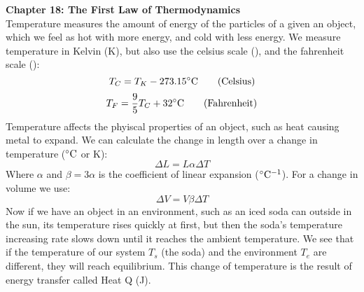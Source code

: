 \documentclass[11pt]{article}
\newcommand{\fahrenheit}{\degree \text{F}}
\begin{document}
    \noindent \textbf{Chapter 18: The First Law of Thermodynamics}
    \\ \noindent \newline Temperature measures the amount of energy of the particles of a given an object,
    which we feel as hot with more energy, and cold with less energy.
    We measure temperature in Kelvin (K),
    but also use the celsius scale (\celsius), and the fahrenheit scale (\fahrenheit):
    \begin{equation}
       T_C = T_K - 273.15\celsius \tag{Celsius}
    \end{equation}
    \begin{equation}
        T_F = \frac{9}{5}T_C + 32\celsius \tag{Fahrenheit}
    \end{equation}
    \noindent Temperature affects the phyiscal properties of an object, such as heat causing metal to expand.
    We can calculate the change in length over a change in temperature ($\celsius$ or K):
    \begin{equation}
        \Delta L = L \alpha \Delta T \tag{linear expansion}
    \end{equation}
    \noindent Where $\alpha$ and $ \beta = 3\alpha$ is the coefficient of linear expansion ($\celsius^{-1}$).
    For a change in volume we use:
    \begin{equation}
        \Delta V = V \beta \Delta T \tag{volume expansion}
    \end{equation}
    \noindent Now if we have an object in an environment, such as an iced soda can outside in the sun,
    its temperature rises quickly at first, but then the soda's temperature increasing rate slows down
    until it reaches the ambient temperature.
    We see that if the temperature of our system $T_s$ (the soda) and the environment $T_e$ are different, they
    will reach equilibrium.
    This change of temperature is the result of energy transfer called Heat Q (J).
\end{document}
